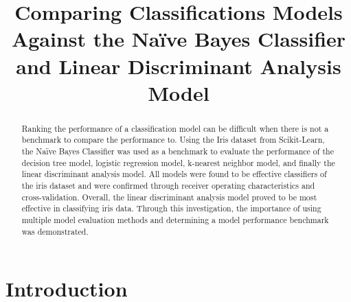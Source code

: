 \documentclass[journal]{IEEEtran}
\begin{document}
\setlength{\emergencystretch}{12pt}
\setlength{\parindent}{10pt}



\lstset{style=mystyle}

\title{Comparing Classifications Models Against the Naïve Bayes Classifier and Linear Discriminant Analysis Model}

\author{
}

\maketitle

\begin{abstract}
\label{log:abstract}

Ranking the performance of a classification model can be difficult when there is not a benchmark to compare the performance to. Using the Iris dataset from Scikit-Learn, the Naïve Bayes Classifier was used as a benchmark to evaluate the performance of the decision tree model, logistic regression model, k-nearest neighbor model, and finally the linear discriminant analysis model. All models were found to be effective classifiers of the iris dataset and were confirmed through receiver operating characteristics and cross-validation. Overall, the linear discriminant analysis model proved to be most effective in classifying iris data. Through this investigation, the importance of using multiple model evaluation methods and determining a model performance benchmark was demonstrated. 

\end{abstract}

\section{Introduction}
\label{sec:intro}
\end{document}
